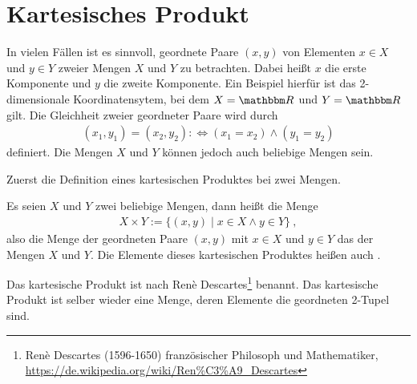 
\section{Kartesisches Produkt}
\label{sec:Mengen:Kartesisches Produkt}

\begin{Unit}[Anmerkung]
In vielen Fällen ist es sinnvoll, geordnete Paare $(x, y)$ von Elementen $x \in 
X$ und $y \in Y$ zweier Mengen $X$ und $Y$ zu betrachten. Dabei heißt $x$ die
erste Komponente und $y$ die zweite Komponente. Ein Beispiel hierfür ist das 
2-dimensionale Koordinatensytem, bei dem $X = \RR$ und $Y = \RR$ gilt. Die 
Gleichheit zweier geordneter Paare wird durch
\begin{align}
  (x_1,y_1) = (x_2,y_2) :\Leftrightarrow (x_1 = x_2) \land (y_1 = y_2)
\end{align}
definiert. Die Mengen $X$ und $Y$ können jedoch auch beliebige Mengen sein.
\end{Unit}

\begin{Unit}
Zuerst die Definition eines kartesischen Produktes bei zwei Mengen. 

\begin{Definition}
  Es seien $X$ und $Y$ zwei beliebige Mengen, dann heißt die Menge
  \begin{align}
    X \times Y := \{ (x,y) \mid x \in X \land y \in Y \} \ ,
  \end{align}
  also die Menge der geordneten Paare $(x,y)$ mit $x \in X$ und $y \in Y$ das
   der Mengen $X$ und $Y$. Die Elemente 
  dieses kartesischen Produktes heißen auch 
  .
\end{Definition}

Das kartesische Produkt ist nach Ren\`{e} Descartes\footnote{Ren\`{e} 
Descartes (1596-1650) französischer Philosoph und Mathematiker,
\url{https://de.wikipedia.org/wiki/Ren\%C3\%A9_Descartes}} 
 benannt. Das kartesische Produkt ist 
selber wieder eine Menge, deren Elemente die geordneten 2-Tupel sind.
\end{Unit}

